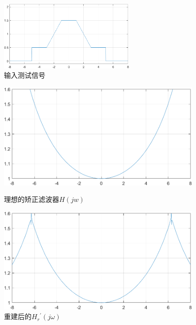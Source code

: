 \documentclass{../source/Experiment}
\begin{document}
            \begin{figure}[H]
                \centering
                \includegraphics[width=0.6\textwidth]{pic/输入测试信号.png}
                \caption{输入测试信号}
            \end{figure}
            \begin{figure}[H]
                \centering
                
                \begin{minipage}[t]{0.48\textwidth}
                    \centering
                    \includegraphics[width=0.9\textwidth]{pic/理想的矫正滤波器H(jw).png}
                    \caption{理想的矫正滤波器$H(jw)$}
                \end{minipage}
                \begin{minipage}[t]{0.48\textwidth}
                    \centering
                    \includegraphics[width=0.9\textwidth]{pic/重建后的Hr'(jw).png}
                    \caption{重建后的$H_{r}{ }^{\prime}(j \omega)$}
                \end{minipage}


\end{figure}
\end{document}
